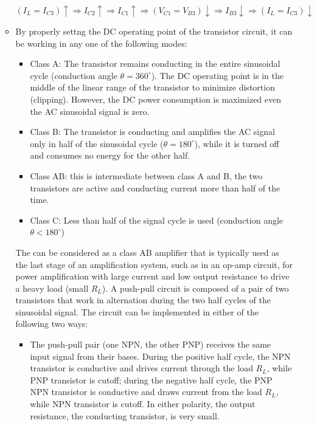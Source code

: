 \begin{itemize}
\begin{itemize}

  
  
  \[
  (I_L=I_{C3})\uparrow \Longrightarrow I_{C2}\uparrow \Longrightarrow 
  I_{C1}\uparrow\Longrightarrow (V_{C1}=V_{B3})\downarrow \Longrightarrow 
  I_{B3}\downarrow \Longrightarrow (I_L=I_{C3})\downarrow
  \]

\item {}

By properly settng the DC operating point of the transistor circuit, 
it can be working in any one of the following modes:
\begin{itemize}
\item Class A: The transistor remains conducting in the entire sinusoidal
  cycle (conduction angle $\theta=360^\circ$). The DC operating point is 
  in the middle of the linear range of the transistor to minimize distortion
  (clipping). However, the DC power consumption is maximized even the AC 
  sinusoidal signal is zero. 
  
\item Class B: The transistor is conducting and amplifies the AC signal
  only in half of the sinusoidal cycle ($\theta=180^\circ$), while it is
  turned off and consumes no energy for the other half.

\item Class AB: this is intermediate between class A and B, the two 
  transistors are active and conducting current more than half of the
  time.

\item Class C: Less than half of the signal cycle is used (conduction angle
  $\theta<180^\circ$)

\end{itemize}

  The  can be considered as a class AB amplifier that is 
  typically used as the last stage of an amplification system, such as 
  in an op-amp circuit, for power amplification with large current and
  low output resistance to drive a heavy load (small $R_L$). A push-pull
  circuit is composed of a pair of two transistors that work in alternation
  during the two half cycles of the sinusoidal signal. The circuit can be 
  implemented in either of the following two ways:
  \begin{itemize}
  \item The push-pull pair (one NPN, the other PNP) receives the same 
    input signal from their bases. During the positive half cycle, the 
    NPN transistor is conductive and drives current through the load 
    $R_L$, while PNP transistor is cutoff; during the negative half cycle, 
    the PNP NPN transistor is conductive and draws current from the load 
    $R_L$, while NPN transistor is cutoff. In either polarity, the output 
    resistance, the conducting transistor, is very small.


\end{itemize}
\end{itemize}
\end{itemize}
